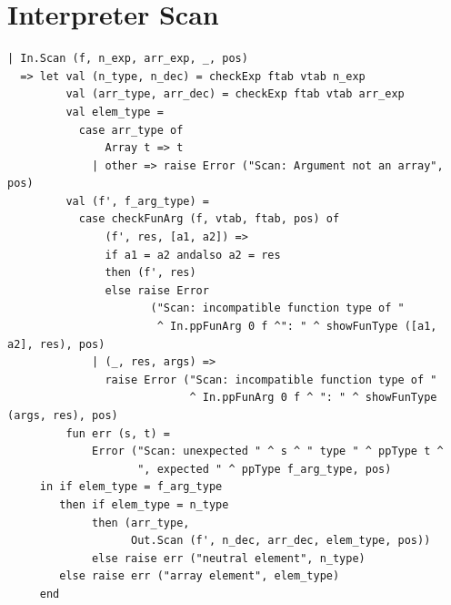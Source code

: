 \documentclass[11pt]{article}
\begin{document}
    \newpage
    \section{Interpreter Scan} \label{interpreter_scan}
    \begin{lstlisting}[basicstyle=\small]
| In.Scan (f, n_exp, arr_exp, _, pos)
  => let val (n_type, n_dec) = checkExp ftab vtab n_exp
         val (arr_type, arr_dec) = checkExp ftab vtab arr_exp
         val elem_type =
           case arr_type of
               Array t => t
             | other => raise Error ("Scan: Argument not an array", pos)
         val (f', f_arg_type) =
           case checkFunArg (f, vtab, ftab, pos) of
               (f', res, [a1, a2]) =>
               if a1 = a2 andalso a2 = res
               then (f', res)
               else raise Error
                      ("Scan: incompatible function type of "
                       ^ In.ppFunArg 0 f ^": " ^ showFunType ([a1, a2], res), pos)
             | (_, res, args) =>
               raise Error ("Scan: incompatible function type of "
                            ^ In.ppFunArg 0 f ^ ": " ^ showFunType (args, res), pos)
         fun err (s, t) =
             Error ("Scan: unexpected " ^ s ^ " type " ^ ppType t ^
                    ", expected " ^ ppType f_arg_type, pos)
     in if elem_type = f_arg_type
        then if elem_type = n_type
             then (arr_type,
                   Out.Scan (f', n_dec, arr_dec, elem_type, pos))
             else raise err ("neutral element", n_type)
        else raise err ("array element", elem_type)
     end
    \end{lstlisting}

    \newpage
\end{document}
